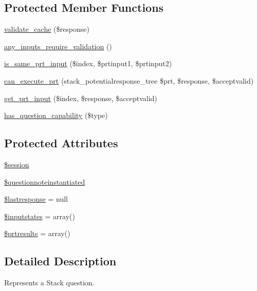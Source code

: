 \subsection*{Protected Member Functions}
\begin{DoxyCompactItemize}
\item 
\hyperlink{classqtype__stack__question_a59876ac9e020e04e16221a1e4a06110f}{validate\_\-cache} (\$response)
\item 
\hyperlink{classqtype__stack__question_a9c8334e2954d87067010cd353b8b91b7}{any\_\-inputs\_\-require\_\-validation} ()
\item 
\hyperlink{classqtype__stack__question_a815171df1880921d538f15888eff0ba4}{is\_\-same\_\-prt\_\-input} (\$index, \$prtinput1, \$prtinput2)
\item 
\hyperlink{classqtype__stack__question_aa0e6d5dfc0b67b125ea00e52d138f7c0}{can\_\-execute\_\-prt} (stack\_\-potentialresponse\_\-tree \$prt, \$response, \$acceptvalid)
\item 
\hyperlink{classqtype__stack__question_ae1369f6232dae4ac45154d4c259e7ef9}{get\_\-prt\_\-input} (\$index, \$response, \$acceptvalid)
\item 
\hyperlink{classqtype__stack__question_ae1834d8cc6dfb828866475759855aa27}{has\_\-question\_\-capability} (\$type)
\end{DoxyCompactItemize}
\subsection*{Protected Attributes}
\begin{DoxyCompactItemize}
\item 
\hyperlink{classqtype__stack__question_a23864b386c334ec9125362f83d391848}{\$session}
\item 
\hyperlink{classqtype__stack__question_aae8410727153edc60e14f18b5a49475d}{\$questionnoteinstantiated}
\item 
\hyperlink{classqtype__stack__question_a3d4f3902b2164b1c39201a2665b06bb9}{\$lastresponse} = null
\item 
\hyperlink{classqtype__stack__question_a7f9ce0d0171e5af1ab6b289ff9a157a3}{\$inputstates} = array()
\item 
\hyperlink{classqtype__stack__question_a6764b09997d82324cc78bbe8ccfc31d7}{\$prtresults} = array()
\end{DoxyCompactItemize}


\subsection{Detailed Description}
Represents a Stack question.

